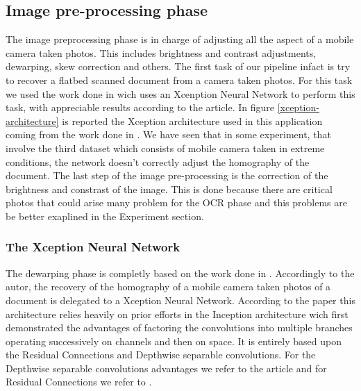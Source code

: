 \documentclass[10pt,twocolumn,letterpaper]{article}
\begin{document}
\subsection{Image pre-processing phase}
The image preprocessing phase is in charge of adjusting all the aspect of a mobile camera taken photos. This includes brightness and contrast adjustments, dewarping, skew correction and others. The first task of our pipeline infact is try to recover a flatbed scanned document from a camera taken photos. For this task we used the work done in \cite{mobile-ocr} wich uses an Xcenption Neural Network \cite{xception_NN} to perform this task, with appreciable results according to the article. In figure \ref{xception-architecture} is reported the Xception architecture used in this application coming from the work done in \cite{Improvingcamera-based}. We have seen that in some experiment, that involve the third dataset which consists of mobile camera taken in extreme conditions, the network doesn't correctly adjust the homography of the document. The last step of the image pre-processing is the correction of the brightness and constrast of the image. This is done because there are critical photos that could arise many problem for the OCR phase and this problems are be better exaplined in the Experiment section.

\subsubsection{The Xception Neural Network}
The dewarping phase is completly based on the work done in \cite{mobile-ocr}. Accordingly to the autor, the recovery of the homography of a mobile camera taken photos of a document is delegated to a Xception Neural Network. According to the paper \cite{xception} this architecture relies heavily on prior efforts in the Inception architecture wich first demonstrated the advantages of factoring the convolutions into multiple branches operating successively on channels and then on space. It is entirely based upon the Residual Connections and Depthwise separable convolutions. For the Depthwise separable convolutions advantages we refer to the article \cite{https://towardsdatascience.com/a-basic-introduction-to-separable-convolutions-b99ec3102728} and for Residual Connections we refer to \cite{https://towardsdatascience.com/residual-blocks-building-blocks-of-resnet-fd90ca15d6ec}.
\end{document}
